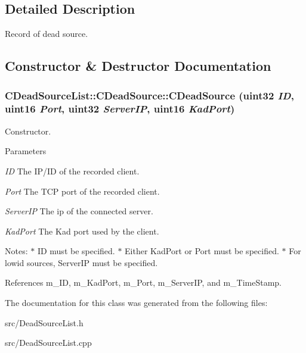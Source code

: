 \subsection{Detailed Description}
Record of dead source. 

\subsection{Constructor \& Destructor Documentation}
\subsubsection[{CDeadSource}]{\setlength{\rightskip}{0pt plus 5cm}CDeadSourceList::CDeadSource::CDeadSource (uint32 {\em ID}, \/  uint16 {\em Port}, \/  uint32 {\em ServerIP}, \/  uint16 {\em KadPort})}\label{classCDeadSourceList_1_1CDeadSource_abd5f4b22449d503f5df4ec4af5870ca8}


Constructor. 
\begin{DoxyParams}{Parameters}
\item[{\em ID}]The IP/ID of the recorded client. \item[{\em Port}]The TCP port of the recorded client. \item[{\em ServerIP}]The ip of the connected server. \item[{\em KadPort}]The Kad port used by the client.\end{DoxyParams}
Notes: $\ast$ ID must be specified. $\ast$ Either KadPort or Port must be specified. $\ast$ For lowid sources, ServerIP must be specified. 

References m\_\-ID, m\_\-KadPort, m\_\-Port, m\_\-ServerIP, and m\_\-TimeStamp.

The documentation for this class was generated from the following files:\begin{DoxyCompactItemize}
\item 
src/DeadSourceList.h\item 
src/DeadSourceList.cpp\end{DoxyCompactItemize}
